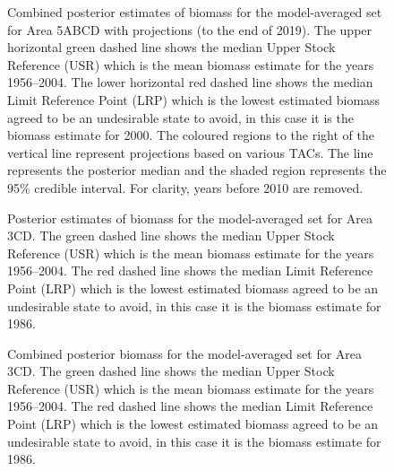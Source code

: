 \documentclass[11pt]{book}
\begin{document}
\clearpage
\begin{figure}[htb]

{\centering {} 

}

\caption{Combined posterior estimates of biomass for the model-averaged set for Area 5ABCD with projections (to the end of 2019).  The upper horizontal green dashed line shows the median Upper Stock Reference (USR) which is the mean biomass estimate for the years 1956--2004. The lower horizontal red dashed line shows the median Limit Reference Point (LRP) which is the lowest estimated biomass agreed to be an undesirable state to avoid, in this case it is the biomass estimate for 2000. The coloured regions to the right of the vertical line represent projections based on various TACs. The line represents the posterior median and the shaded region represents the 95\% credible interval. For clarity, years before 2010 are removed.}\label{fig:fig-model-average-biomass-5abcd-proj}
\end{figure}
\clearpage
\begin{figure}[htb]

{\centering {} 

}

\caption{Posterior estimates of biomass for the model-averaged set for Area 3CD. The green dashed line shows the median Upper Stock Reference (USR) which is the mean biomass estimate for the years 1956--2004. The red dashed line shows the median Limit Reference Point (LRP) which is the lowest estimated biomass agreed to be an undesirable state to avoid, in this case it is the biomass estimate for 1986.}\label{fig:fig-model-average-biomass-comp-3cd}
\end{figure}
\clearpage
\begin{figure}[htb]

{\centering {} 

}

\caption{Combined posterior biomass for the model-averaged set for Area 3CD.  The green dashed line shows the median Upper Stock Reference (USR) which is the mean biomass estimate for the years 1956--2004. The red dashed line shows the median Limit Reference Point (LRP) which is the lowest estimated biomass agreed to be an undesirable state to avoid, in this case it is the biomass estimate for 1986.}\label{fig:fig-model-average-biomass-3cd}
\end{figure}
\end{document}
